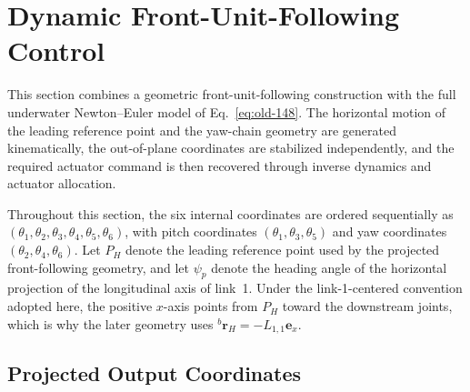 \documentclass[12pt,a4paper]{report}
\begin{document}
\clearpage
\chapter{Dynamic Front-Unit-Following Control}

This section combines a geometric front-unit-following construction with the full underwater Newton--Euler model of Eq.~\eqref{eq:old-148}. The horizontal motion of the leading reference point and the yaw-chain geometry are generated kinematically, the out-of-plane coordinates are stabilized independently, and the required actuator command is then recovered through inverse dynamics and actuator allocation.

Throughout this section, the six internal coordinates are ordered sequentially as $(\theta_1,\theta_2,\theta_3,\theta_4,\theta_5,\theta_6)$, with pitch coordinates $(\theta_1,\theta_3,\theta_5)$ and yaw coordinates $(\theta_2,\theta_4,\theta_6)$. Let $P_H$ denote the leading reference point used by the projected front-following geometry, and let $\psi_p$ denote the heading angle of the horizontal projection of the longitudinal axis of link~1. Under the link-1-centered convention adopted here, the positive $x$-axis points from $P_H$ toward the downstream joints, which is why the later geometry uses ${}^{b}\mathbf{r}_H=-L_{1,1}\mathbf{e}_x$.

\section{Projected Output Coordinates}
\end{document}
